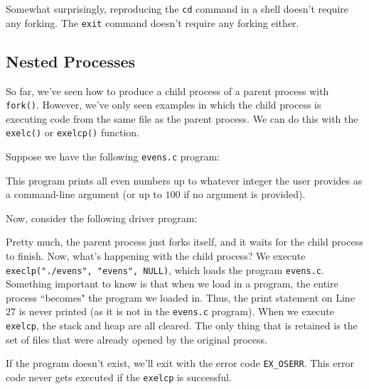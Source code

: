 Somewhat surprisingly, reproducing the \verb!cd! command in a shell doesn't require any forking. The \verb!exit! command doesn't require any forking either.

\subsection{Nested Processes}

So far, we've seen how to produce a child process of a parent process with \verb!fork()!. However, we've only seen examples in which the child process is executing code from the same file as the parent process. We can do this with the \verb!exelc()! or \verb!exelcp()!  function.


Suppose we have the following \verb!evens.c! program:

\lstset{
caption=Evens
}
\begin{center}

\end{center}

This program prints all even numbers up to whatever integer the user provides as a command-line argument (or up to $100$ if no argument is provided).

Now, consider the following driver program:

\lstset{
caption=Exec Evens
}
\begin{center}

\end{center}

Pretty much, the parent process just forks itself, and it waits for the child process to finish. Now, what's happening with the child process? We execute \verb!execlp("./evens", "evens", NULL)!, which loads the program \verb!evens.c!. Something important to know is that when we load in a program, the entire process ``becomes" the program  we loaded in. Thus, the print statement on Line $27$ is never printed (as it is not in the \verb!evens.c! program). When we execute \verb!exelcp!, the stack and heap are all cleared. The only thing that is retained is the set of files that were already opened by the original process.

If the program doesn't exist, we'll exit with the error code \verb!EX_OSERR!. This error code never gets executed if the \verb!exelcp! is successful.





